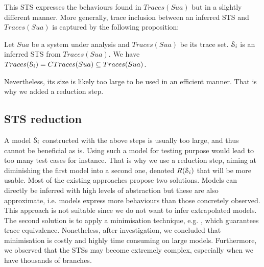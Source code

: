 This STS expresses the behaviours found in $Traces(Sua)$ but in a
slightly different manner. More generally, trace inclusion
between an inferred STS and $Traces(Sua)$ is captured by the
following proposition:

\begin{proposition}
  Let $Sua$ be a system under analysis and $Traces(Sua)$ be its
  trace set. $\EuScript{S}_i$ is an inferred STS from
  $Traces(Sua)$.
  We have $Traces(\EuScript{S}_i) = CTraces(Sua) \subseteq Traces(Sua)$.

	\label{def:equivtraces_IOSTS}
\end{proposition}

Nevertheless, its size is likely too large to be used in an
efficient manner. That is why we added a reduction step.

\subsection{STS reduction}
\label{sec:modelinf:prodsystems:reduction}

A model $\EuScript{S}_i$ constructed with the above steps is
usually too large, and thus cannot be beneficial as is. Using
such a model for testing purpose would lead to too many test
cases for instance. That is why we use a reduction step, aiming
at diminishing the first model into a second one, denoted
$R(\EuScript{S}_i)$ that will be more usable. Most of the
existing approaches propose two solutions. Models can directly be
inferred with high levels of abstraction but these are also
approximate, i.e. models express more behaviours than those
concretely observed. This approach is not suitable since we do
not want to infer extrapolated models. The second solution is to
apply a minimisation technique, e.g. \cite{Abdulla06}, which
guarantees trace equivalence. Nonetheless, after investigation,
we concluded that minimisation is costly and highly time
consuming on large models. Furthermore, we observed that the STSs
may become extremely complex, especially when we have thousands
of branches.

